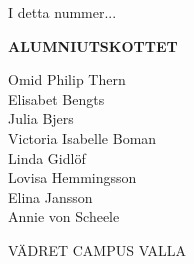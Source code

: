 \documentclass[10pt,final,hyphenatedtitles]{papertex}
\begin{document}
\begin{frontpage}
\begin{indexblock}{I detta nummer...}


\end{indexblock}

\begin{authorblock}

\textbf{ALUMNIUTSKOTTET}

Omid Philip Thern\\
Elisabet Bengts\\
Julia Bjers\\
Victoria Isabelle Boman\\
Linda Gidlöf\\
Lovisa Hemmingsson\\
Elina Jansson\\
Annie von Scheele\\

\end{authorblock}


\begin{weatherblock}{VÄDRET CAMPUS VALLA}
\end{weatherblock}





\end{frontpage}
\clearpage

\newsection{}








\newssep



\newssep



\newssep



\newssep



\newssep



\newssep



\newssep


\end{document}
